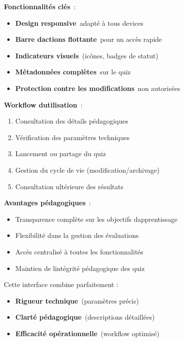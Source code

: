 \documentclass[12pt,a4paper,twoside,openright]{report}
\begin{document}
\textbf{Fonctionnalités clés}~:

\begin{itemize}
\item
  \textbf{Design responsive}~adapté à tous devices
\item
  \textbf{Barre d\textquotesingle actions flottante}~pour un accès
  rapide
\item
  \textbf{Indicateurs visuels}~(icônes, badges de statut)
\item
  \textbf{Métadonnées complètes}~sur le quiz
\item
  \textbf{Protection contre les modifications}~non autorisées
\end{itemize}

\textbf{Workflow d\textquotesingle utilisation}~:

\begin{enumerate}
\def\labelenumi{\arabic{enumi}.}
\item
  Consultation des détails pédagogiques
\item
  Vérification des paramètres techniques
\item
  Lancement ou partage du quiz
\item
  Gestion du cycle de vie (modification/archivage)
\item
  Consultation ultérieure des résultats
\end{enumerate}

\textbf{Avantages pédagogiques}~:

\begin{itemize}
\item
  Transparence complète sur les objectifs
  d\textquotesingle apprentissage
\item
  Flexibilité dans la gestion des évaluations
\item
  Accès centralisé à toutes les fonctionnalités
\item
  Maintien de l\textquotesingle intégrité pédagogique des quiz
\end{itemize}

Cette interface combine parfaitement :

\begin{itemize}
\item
  \textbf{Rigueur technique}~(paramètres précis)
\item
  \textbf{Clarté pédagogique}~(descriptions détaillées)
\item
  \textbf{Efficacité opérationnelle}~(workflow optimisé)
\end{itemize}
\end{document}
